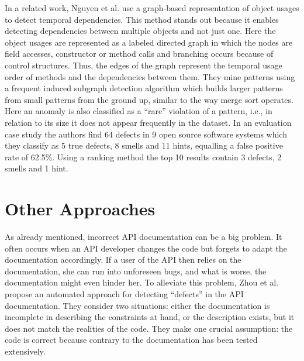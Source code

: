 In a related work, Nguyen et al. \cite{nguyen2009graph} use a graph-based representation of object usages to detect temporal dependencies.
This method stands out because it enables detecting dependencies between multiple objects and not just one.
Here the object usages are represented as a labeled directed graph in which the nodes are field accesses, constructor or method calls and branching occurs because of control structures.
Thus, the edges of the graph represent the temporal usage order of methods and the dependencies between them.
They mine patterns using a frequent induced subgraph detection algorithm which builds larger patterns from small patterns from the ground up, similar to the way merge sort operates.
Here an anomaly is also classified as a ``rare'' violation of a pattern, i.e., in relation to its size it does not appear frequently in the dataset.
In an evaluation case study the authors find 64 defects in 9 open source software systems which they classify as 5 true defects, 8 smells and 11 hints, equalling a false positive rate of 62.5\%.
Using a ranking method the top 10 results contain 3 defects, 2 smells and 1 hint.


\section{Other Approaches}

As already mentioned, incorrect API documentation can be a big problem.
It often occurs when an API developer changes the code but forgets to adapt the documentation accordingly.
If a user of the API then relies on the documentation, she can run into unforeseen bugs, and what is worse, the documentation might even hinder her.
To alleviate this problem, Zhou et al.  \cite{zhou2017analyzing} propose an automated approach for detecting ``defects'' in the API documentation.
They consider two situations: either the documentation is incomplete in describing the constraints at hand, or the description exists, but it does not match the realities of the code.
They make one crucial assumption: the code is correct because contrary to the documentation has been tested extensively.

